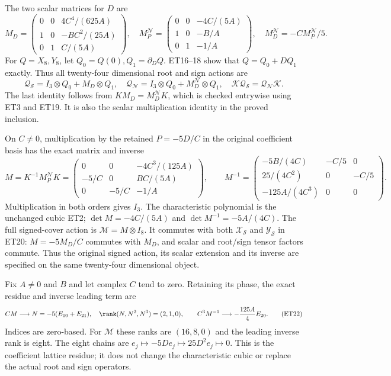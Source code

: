 The two scalar matrices for $D$ are
\[
 M_D=\begin{pmatrix}
 0&0&4C^4/(625A)\\1&0&-BC^2/(25A)\\0&1&C/(5A)
 \end{pmatrix},\quad
 M_P^{\mathscr N}=\begin{pmatrix}
 0&0&-4C/(5A)\\1&0&-B/A\\0&1&-1/A
 \end{pmatrix},\quad M_D^{\mathscr N}=-CM_P^{\mathscr N}/5.
 \tag{ET19}
\]
For $Q=X_8,Y_8$, let $Q_0=Q(0),Q_1=\partial_DQ$.
ET16--18 show that $Q=Q_0+DQ_1$ exactly.
Thus all twenty-four dimensional root and sign actions are
\[
 \mathcal Q_{\mathscr S}=I_3\otimes Q_0+M_D\otimes Q_1,\quad
 \mathcal Q_{\mathscr N}=I_3\otimes Q_0+M_D^{\mathscr N}\otimes Q_1,
 \quad \mathcal K\mathcal Q_{\mathscr S}
 =\mathcal Q_{\mathscr N}\mathcal K .
 \tag{ET20}
\]
The last identity follows from $KM_D=M_D^{\mathscr N}K$,
which is checked entrywise using ET3 and ET19.
It is also the scalar multiplication identity in the proved inclusion.

On $C\ne0$, multiplication by the retained $P=-5D/C$ in the
original coefficient basis has the exact matrix and inverse
\[
 M=K^{-1}M_P^{\mathscr N}K
 =\begin{pmatrix}
 0&0&-4C^3/(125A)\\-5/C&0&BC/(5A)\\0&-5/C&-1/A
 \end{pmatrix},
 \qquad
 M^{-1}=\begin{pmatrix}
 -5B/(4C)&-C/5&0\\25/(4C^2)&0&-C/5\\-125A/(4C^3)&0&0
 \end{pmatrix}.
 \tag{ET21}
\]
Multiplication in both orders gives $I_3$.
The characteristic polynomial is the unchanged cubic ET2;
$\det M=-4C/(5A)$ and $\det M^{-1}=-5A/(4C)$.
The full signed-cover action is $\mathcal M=M\otimes I_8$.
It commutes with both $\mathcal X_{\mathscr S}$ and
$\mathcal Y_{\mathscr S}$ in ET20: $M=-5M_D/C$ commutes with
$M_D$, and scalar and root/sign tensor factors commute.
Thus the original signed action, its scalar extension and its inverse
are specified on the same twenty-four dimensional object.

Fix $A\ne0$ and $B$ and let complex $C$ tend to zero.
Retaining its phase, the exact residue and inverse leading term are
\[
 C M\longrightarrow N=-5(E_{10}+E_{21}),\quad
 \rank(N,N^2,N^3)=(2,1,0),\qquad
 C^3M^{-1}\longrightarrow-\frac{125A}{4}E_{20}.
 \tag{ET22}
\]
Indices are zero-based. For $\mathcal M$ these ranks are
$(16,8,0)$ and the leading inverse rank is eight.
The eight chains are $e_j\mapsto-5De_j\mapsto25D^2e_j\mapsto0$.
This is the coefficient lattice residue; it does not change the
characteristic cubic or replace the actual root and sign operators.

